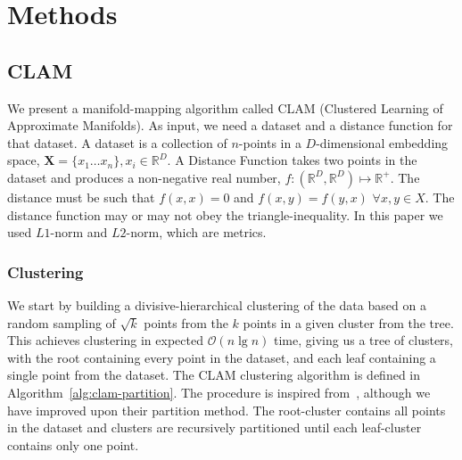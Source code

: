 \section{Methods}
\label{sec:methods}


\subsection{CLAM}
\label{subsec:methods:clam}

We present a manifold-mapping algorithm called CLAM (Clustered Learning of Approximate Manifolds).
As input, we need a dataset and a distance function for that dataset.
A dataset is a collection of $n$-points in a $D$-dimensional embedding space, $\textbf{X} = \{x_1 \dots x_n\}, x_i \in \mathbb{R}^D$.
A Distance Function takes two points in the dataset and produces a non-negative real number, $f : (\mathbb{R}^D, \mathbb{R}^D) \mapsto \mathbb{R}^+$.
The distance must be such that $f(x, x) = 0$ and $f(x, y) = f(y, x)$ $\forall x, y \in X$.
The distance function may or may not obey the triangle-inequality.
In this paper we used $L1$-norm and $L2$-norm, which are metrics.

\subsubsection{Clustering}
\label{subsubsec:methods:clam:clustering}

We start by building a divisive-hierarchical clustering of the data based on a random sampling of $\sqrt k$ points from the  $k$ points in a given cluster from the tree.
This achieves clustering in expected $\mathcal{O}(n \lg n)$ time, giving us a tree of clusters, with the root containing every point in the dataset, and each leaf containing a single point from the dataset.
The CLAM clustering algorithm is defined in Algorithm~\ref{alg:clam-partition}.
The procedure is inspired from~\cite{ishaq2019clustered}, although we have improved upon their partition method.
The root-cluster contains all points in the dataset and clusters are recursively partitioned until each leaf-cluster contains only one point.

